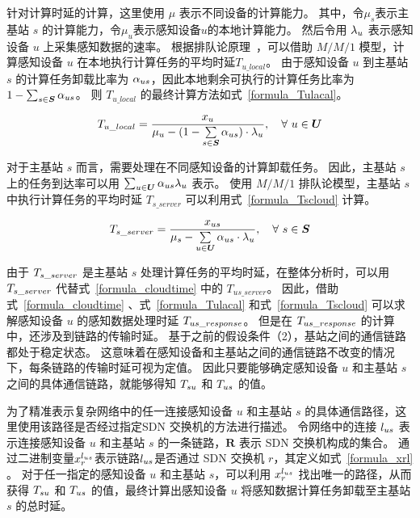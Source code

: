 针对计算时延的计算，这里使用 $\mu$ 表示不同设备的计算能力。
其中，令$\mu_s$表示主基站 $s$ 的计算能力，令$\mu_u$表示感知设备$u$的本地计算能力。
然后令用 ${\lambda}_{u}$ 表示感知设备 $u$ 上采集感知数据的速率。
根据排队论原理~\cite{Queueing:systems}，可以借助 $M/M/1$ 模型，计算感知设备 $u$ 在本地执行计算任务的平均时延$T_{u\_local}$。
由于感知设备 $u$ 到主基站 $s$ 的计算任务卸载比率为 ${\alpha}_{us}$，因此本地剩余可执行的计算任务比率为 $1 - \sum_{s \in \boldsymbol{S}}{\alpha}_{us}$。
则 $T_{u\_local}$ 的最终计算方法如式~\eqref{formula_Tulacal}。

\begin{equation}
  \label{formula_Tulacal}
  {T}_{u\_local} = \frac{{x}_{u}}{{\mu}_{u} - (1 - \sum\limits_{s \in \boldsymbol{S}} {\alpha}_{us}) \cdot {\lambda}_{u}}, \quad \forall \ u \in \boldsymbol{U}
\end{equation}

对于主基站 $s$ 而言，需要处理在不同感知设备的计算卸载任务。
因此，主基站 $s$ 上的任务到达率可以用 $\sum_{u \in \boldsymbol{U}} {\alpha}_{us} {\lambda}_{u}$ 表示。
使用 $M/M/1$ 排队论模型，主基站 $s$ 中执行计算任务的平均时延 $T_{s\_server}$ 可以利用式~\eqref{formula_Tscloud} 计算。

\begin{equation}
\label{formula_Tscloud}
{T}_{s\_server} = \frac{{x}_{us}}{{\mu}_{s} - \sum\limits_{u \in \boldsymbol{U}} {\alpha}_{us} \cdot {\lambda}_{u}}, \quad \forall \ s \in \boldsymbol{S}
\end{equation}

由于 ${T}_{s\_server}$ 是主基站 $s$ 处理计算任务的平均时延，在整体分析时，可以用 ${T}_{s\_server}$ 代替式~\eqref{formula_cloudtime} 中的 $T_{us\_server}$。
因此，借助式~\eqref{formula_cloudtime} 、式~\eqref{formula_Tulacal} 和式~\eqref{formula_Tscloud} 可以求解感知设备 $u$ 的感知数据处理时延 ${T}_{us\_response}$。
但是在 ${T}_{us\_response}$ 的计算中，还涉及到链路的传输时延。
基于之前的假设条件（2），基站之间的通信链路都处于稳定状态。
这意味着在感知设备和主基站之间的通信链路不改变的情况下，每条链路的传输时延可视为定值。
因此只要能够确定感知设备 $u$ 和主基站 $s$ 之间的具体通信链路，就能够得知 ${T}_{su}$ 和 ${T}_{us}$ 的值。

为了精准表示复杂网络中的任一连接感知设备 $u$ 和主基站 $s$ 的具体通信路径，这里使用该路径是否经过指定SDN 交换机的方法进行描述。
令网络中的连接 $l_{us}$ 表示连接感知设备 $u$ 和主基站 $s$ 的一条链路，$\boldsymbol{R}$ 表示 SDN 交换机构成的集合。
通过二进制变量$x^{l_{us}}_{r}$表示链路$l_{us}$是否通过 SDN 交换机 $r$，其定义如式~\eqref{formula_xrl} 。
对于任一指定的感知设备 $u$ 和主基站 $s$，可以利用 $x^{l_{us}}_{r}$ 找出唯一的路径，从而获得 ${T}_{su}$ 和 ${T}_{us}$ 的值，最终计算出感知设备 $u$ 将感知数据计算任务卸载至主基站 $s$ 的总时延。

